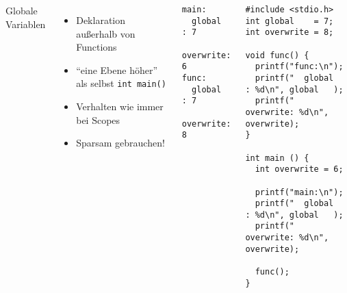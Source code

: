 
\begin{frame}[fragile]%
%
\begin{columns}[b]
\begin{Large}
{Globale Variablen}
\vspace{10pt}
\end{Large}
\begin{itemize}
\item Deklaration außerhalb von Functions
\item \enquote{eine Ebene höher} als selbst \texttt{int main()}
\item Verhalten wie immer bei Scopes
\item Sparsam gebrauchen!
\end{itemize}
%
\begin{cmdbox}[Ausgabe]
\begin{verbatim}
main:
  global   : 7
  overwrite: 6
func:
  global   : 7
  overwrite: 8
\end{verbatim}
\end{cmdbox}
%
\begin{codebox}
\begin{verbatim}
#include <stdio.h>
int global    = 7;
int overwrite = 8;

void func() {
  printf("func:\n");
  printf("  global   : %d\n", global   );
  printf("  overwrite: %d\n", overwrite);
}

int main () {
  int overwrite = 6;
  
  printf("main:\n");
  printf("  global   : %d\n", global   );
  printf("  overwrite: %d\n", overwrite);
  
  func();
}
\end{verbatim}
\end{codebox}
\end{columns}
%
\end{frame}


